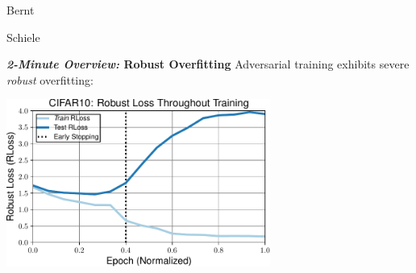 \documentclass[64pt,aspectratio=169]{beamer}
\begin{document}
\begin{frame}
\begin{center}
\begin{center}
\begin{minipage}{0.225\textwidth}
					\footnotesize
					
					Bernt
					
					Schiele
				\end{minipage}
			\end{center}
			\vspace*{-0.25cm}
			
			\begin{minipage}[t]{4.5cm}
				\vspace*{0px}
				\centering
			\end{minipage}
			\hspace*{0.25cm}
			\begin{minipage}[t]{4.5cm}
				\vspace*{0px}
				\centering
			\end{minipage}
		\end{center}
	\end{frame}
	\endgroup
	
	\begin{frame}[t]{\bfseries \textit{2-Minute Overview:} Robust Overfitting}
		\Large
		Adversarial training exhibits severe \emph{robust} overfitting:
		\vspace*{-2px}
		\begin{center}
			\includegraphics[height=5.5cm]{plots/talk_overview12.pdf}
		\end{center}
	\end{frame}
	
\end{document}
